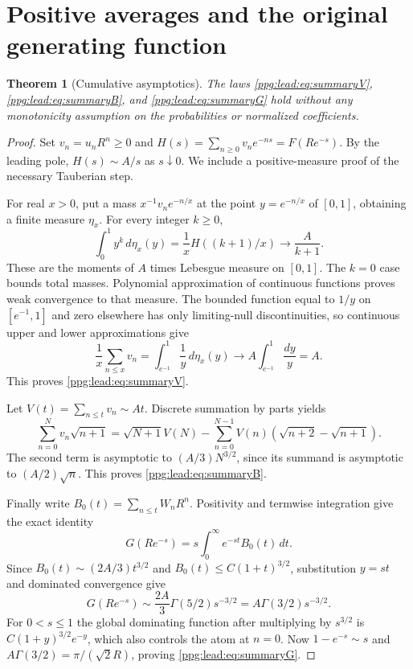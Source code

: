 \documentclass[11pt,letterpaper]{article}
\newtheorem{theorem}{Theorem}[section]
\theoremstyle{remark}\newtheorem{remark}[theorem]{Remark}
\numberwithin{equation}{section}
\begin{document}
\section{Positive averages and the original generating function}\label{ppg:lead:sec:tauberian}
\begin{theorem}[Cumulative asymptotics]\label{ppg:lead:thm:averages}
The laws \eqref{ppg:lead:eq:summaryV}, \eqref{ppg:lead:eq:summaryB}, and \eqref{ppg:lead:eq:summaryG} hold without any monotonicity assumption on the probabilities or normalized coefficients.
\end{theorem}
\begin{proof}
Set $v_n=u_nR^n\ge0$ and $H(s)=\sum_{n\ge0}v_ne^{-ns}=F(Re^{-s})$. By the leading pole, $H(s)\sim A/s$ as $s\downarrow0$. We include a positive-measure proof of the necessary Tauberian step.

For real $x>0$, put a mass $x^{-1}v_ne^{-n/x}$ at the point $y=e^{-n/x}$ of $[0,1]$, obtaining a finite measure $\eta_x$. For every integer $k\ge0$,
\[
 \int_0^1y^k\,d\eta_x(y)=\frac1xH((k+1)/x)\longrightarrow\frac A{k+1}.
\]
These are the moments of $A$ times Lebesgue measure on $[0,1]$. The $k=0$ case bounds total masses. Polynomial approximation of continuous functions proves weak convergence to that measure. The bounded function equal to $1/y$ on $[e^{-1},1]$ and zero elsewhere has only limiting-null discontinuities, so continuous upper and lower approximations give
\[
 \frac1x\sum_{n\le x}v_n
 =\int_{e^{-1}}^1\frac1y\,d\eta_x(y)
 \longrightarrow A\int_{e^{-1}}^1\frac{dy}{y}=A.
\]
This proves \eqref{ppg:lead:eq:summaryV}.

Let $V(t)=\sum_{n\le t}v_n\sim At$. Discrete summation by parts yields
\[
 \sum_{n=0}^Nv_n\sqrt{n+1}
 =\sqrt{N+1}V(N)-\sum_{n=0}^{N-1}V(n)(\sqrt{n+2}-\sqrt{n+1}).
\]
The second term is asymptotic to $(A/3)N^{3/2}$, since its summand is asymptotic to $(A/2)\sqrt n$. This proves \eqref{ppg:lead:eq:summaryB}.

Finally write $B_0(t)=\sum_{n\le t}W_nR^n$. Positivity and termwise integration give the exact identity
\[
 G(Re^{-s})=s\int_0^\infty e^{-st}B_0(t)\,dt.
\]
Since $B_0(t)\sim(2A/3)t^{3/2}$ and $B_0(t)\le C(1+t)^{3/2}$, substitution $y=st$ and dominated convergence give
\[
 G(Re^{-s})\sim\frac{2A}{3}\Gamma(5/2)s^{-3/2}
 =A\Gamma(3/2)s^{-3/2}.
\]
For $0<s\le1$ the global dominating function after multiplying by $s^{3/2}$ is $C(1+y)^{3/2}e^{-y}$, which also controls the atom at $n=0$. Now $1-e^{-s}\sim s$ and $A\Gamma(3/2)=\pi/(\sqrt2 R)$, proving \eqref{ppg:lead:eq:summaryG}.
\end{proof}
\end{document}
